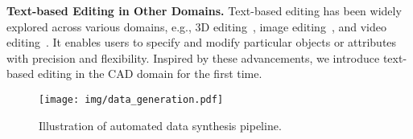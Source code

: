 \noindent\textbf{Text-based Editing in Other Domains.}
Text-based editing has been widely explored across various domains, e.g., 3D editing~\citep{mikaeili2023sked}, image editing~\citep{meng2021sdedit, brooks2023instructpix2pix}, and video editing~\citep{chai2023stablevideo, ceylan2023pix2video}.
It enables users to specify and modify particular objects or attributes with precision and flexibility.
Inspired by these advancements, we introduce text-based editing in the CAD domain for the first time.

\begin{figure*}[t]
\begin{center}
\texttt{[image: img/data\_generation.pdf]}  
\end{center}
\caption{
Illustration of automated data synthesis pipeline.
}
\label{fig:data_generation}
\end{figure*}